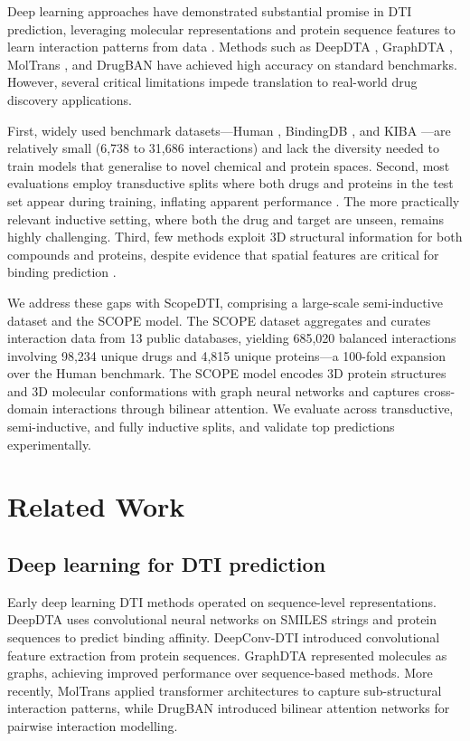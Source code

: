 \documentclass[11pt]{article}
\begin{document}
Deep learning approaches have demonstrated substantial promise in DTI prediction, leveraging molecular representations and protein sequence features to learn interaction patterns from data \citep{ozturk2018,nguyen2021,bai2023}. Methods such as DeepDTA \citep{ozturk2018}, GraphDTA \citep{nguyen2021}, MolTrans \citep{huang2021}, and DrugBAN \citep{bai2023} have achieved high accuracy on standard benchmarks. However, several critical limitations impede translation to real-world drug discovery applications.

First, widely used benchmark datasets---Human \citep{liu2015}, BindingDB \citep{gilson2016}, and KIBA \citep{tang2014}---are relatively small (6,738 to 31,686 interactions) and lack the diversity needed to train models that generalise to novel chemical and protein spaces. Second, most evaluations employ transductive splits where both drugs and proteins in the test set appear during training, inflating apparent performance \citep{huang2021,luo2017}. The more practically relevant inductive setting, where both the drug and target are unseen, remains highly challenging. Third, few methods exploit 3D structural information for both compounds and proteins, despite evidence that spatial features are critical for binding prediction \citep{stepniewska2018,zheng2020}.

We address these gaps with ScopeDTI, comprising a large-scale semi-inductive dataset and the SCOPE model. The SCOPE dataset aggregates and curates interaction data from 13 public databases, yielding 685,020 balanced interactions involving 98,234 unique drugs and 4,815 unique proteins---a 100-fold expansion over the Human benchmark. The SCOPE model encodes 3D protein structures and 3D molecular conformations with graph neural networks and captures cross-domain interactions through bilinear attention. We evaluate across transductive, semi-inductive, and fully inductive splits, and validate top predictions experimentally.

\section{Related Work}

\subsection{Deep learning for DTI prediction}
Early deep learning DTI methods operated on sequence-level representations. DeepDTA \citep{ozturk2018} uses convolutional neural networks on SMILES strings and protein sequences to predict binding affinity. DeepConv-DTI \citep{lee2019} introduced convolutional feature extraction from protein sequences. GraphDTA \citep{nguyen2021} represented molecules as graphs, achieving improved performance over sequence-based methods. More recently, MolTrans \citep{huang2021} applied transformer architectures to capture sub-structural interaction patterns, while DrugBAN \citep{bai2023} introduced bilinear attention networks for pairwise interaction modelling.
\end{document}
